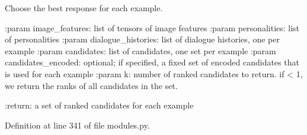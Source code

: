 \begin{DoxyVerb}Choose the best response for each example.

:param image_features:
    list of tensors of image features
:param personalities:
    list of personalities
:param dialogue_histories:
    list of dialogue histories, one per example
:param candidates:
    list of candidates, one set per example
:param candidates_encoded:
    optional; if specified, a fixed set of encoded candidates that is
    used for each example
:param k:
    number of ranked candidates to return. if < 1, we return the ranks
    of all candidates in the set.

:return:
    a set of ranked candidates for each example
\end{DoxyVerb}
 

Definition at line 341 of file modules.\+py.



